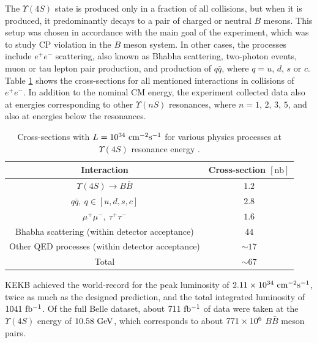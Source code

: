 The $\Upsilon(4S)$ state is produced only in a fraction of all collisions, but when it is produced, it predominantly decays to a pair of charged or neutral $B$ mesons. This setup was chosen in accordance with the main goal of the experiment, which was to study CP
violation in the $B$ meson system. In other cases, the processes include $e^+e^-$ scattering, also known as Bhabha scattering, two-photon events, muon or tau lepton pair production, and production of $q \bar q$, where $q=u,\,d,\,s$ or $c$. Table \ref{tab:xsec} shows the cross-sections for all mentioned interactions in collisions of $e^+e^-$.
In addition to the nominal CM energy, the experiment collected data also at energies
corresponding to other $\Upsilon(nS)$ resonances, where $n = 1,\,2,\,3,\,5$, and also at energies below the resonances.

\begin{table}[!htb]
	\centering
	\begin{tabular}{|c|c|}
		\hline
		Interaction & Cross-section $[\mathrm{nb}]$ \\ 
		\hline
		$\Upsilon(4S) \to B \bar B$ & $1.2$ \\
		$q \bar q,~q \in [u,d,s,c]$ & $2.8$ \\
		$\mu^+\mu^-,~\tau^+\tau^-$ & $1.6$ \\
		Bhabha scattering (within detector acceptance)& $44$ \\
		Other QED processes (within detector acceptance)& $\sim 17$ \\
		\hline
		Total & $\sim 67$ \\
		\hline
	\end{tabular}
	\caption{Cross-sections with $L=10^{34}\mathrm{~cm^{-2}s^{-1}}$ for various physics processes at $\Upsilon(4S)$ resonance energy \cite{ABASHIAN2002117}.}
	\label{tab:xsec}
\end{table}

KEKB achieved the world-record for the peak luminosity of $2.11\times 10^{34}\mathrm{~cm^{-2}s^{-1}}$, twice as much as the designed prediction, and the total integrated luminosity of $1041\mathrm{~fb^{-1}}$. Of the full Belle dataset, about $711\mathrm{~fb^{-1}}$ of data were taken at the $\Upsilon(4S)$ energy of $10.58\mathrm{~GeV}$, which corresponds to about $771\times 10^{6}$ $B \bar B$ meson pairs.

